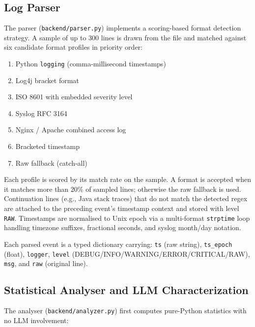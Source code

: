\documentclass[runningheads]{llncs}
\begin{document}
\subsection{Log Parser}
\label{ssec:parser}

The parser (\texttt{backend/parser.py}) implements a scoring-based format
detection strategy. A sample of up to 300 lines is drawn from the file and
matched against six candidate format profiles in priority order:

\begin{enumerate}
  \item Python \texttt{logging} (comma-millisecond timestamps)
  \item Log4j bracket format
  \item ISO 8601 with embedded severity level
  \item Syslog RFC 3164
  \item Nginx / Apache combined access log
  \item Bracketed timestamp
  \item Raw fallback (catch-all)
\end{enumerate}

Each profile is scored by its match rate on the sample. A format is accepted
when it matches more than 20\% of sampled lines; otherwise the raw fallback is
used. Continuation lines (e.g., Java stack traces) that do not match the
detected regex are attached to the preceding event's timestamp context and
stored with level \texttt{RAW}. Timestamps are normalised to Unix epoch via a
multi-format \texttt{strptime} loop handling timezone suffixes, fractional
seconds, and syslog month/day notation.

Each parsed event is a typed dictionary carrying: \texttt{ts} (raw string),
\texttt{ts\_epoch} (float), \texttt{logger}, \texttt{level}
(DEBUG/INFO/WARNING/ERROR/CRITICAL/RAW), \texttt{msg}, and \texttt{raw}
(original line).

\subsection{Statistical Analyser and LLM Characterization}
\label{ssec:analyser}

The analyser (\texttt{backend/analyzer.py}) first computes pure-Python
statistics with no LLM involvement:
\end{document}
